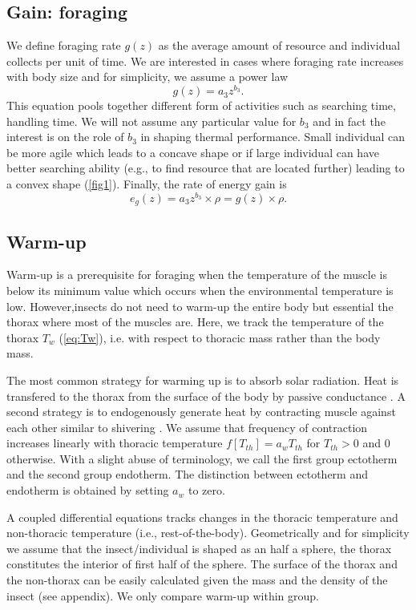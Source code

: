 \subsection*{Gain: foraging}
We define foraging rate $g(z)$ as the average amount of resource and individual collects per unit of time.
We are interested in cases where foraging rate increases with body size and for simplicity, we assume a power law 
\[
	g(z) = a_3 z^{b_3}.
\]
This equation pools together different form of activities such as searching time, handling time.
We will not assume any particular value for $b_3$ and in fact the interest is on the role of $b_3$ in shaping thermal performance.
Small individual can be more agile which leads to a concave shape or if large individual can have better searching ability (e.g., to find resource that are located further) leading to a convex shape (\cref{fig1}). 
Finally, the rate of energy gain is  
\begin{equation} \label{eq:eg}
	e_g(z) = a_3 z^{b_3} \times \rho  = g(z) \times \rho.
\end{equation}

\subsection*{Warm-up}
Warm-up is a prerequisite for foraging when the temperature of the muscle is below its minimum value which occurs when the environmental temperature is low. 
However,insects do not need to warm-up the entire body but essential the thorax where most of the muscles are. 
Here, we track the temperature of the thorax $T_w$ (\cref{eq:Tw}), i.e. with respect to thoracic mass rather than the body mass.

The most common strategy for warming up is to absorb solar radiation.
Heat is transfered to the thorax from the surface of the body by passive conductance \citep{Bakken1976}.
A second strategy is to endogenously generate heat by contracting muscle against each other similar to shivering \citep[e.g.,][]{Kammer1974}.
We assume that frequency of contraction increases linearly with thoracic temperature $f[T_{th}]  = a_w T_{th}$ for $T_{th}> 0$ and 0 otherwise.
With a slight abuse of terminology, we call the first group  ectotherm and the second group endotherm. %
The distinction between ectotherm and endotherm is obtained by setting $a_w$ to zero.

A coupled differential equations  tracks changes in the thoracic temperature and non-thoracic temperature (i.e., rest-of-the-body).%
Geometrically and for simplicity we  assume that the insect/individual is shaped as an half a sphere, the thorax constitutes the interior of first half of the sphere.
The surface of the thorax and the non-thorax can be easily calculated given the mass and the density of the insect (see appendix).
We only compare warm-up within group.

